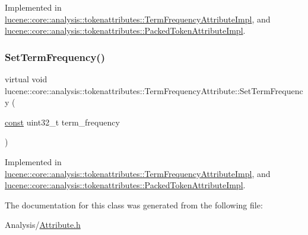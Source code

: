 Implemented in \mbox{\hyperlink{classlucene_1_1core_1_1analysis_1_1tokenattributes_1_1TermFrequencyAttributeImpl_adfd47f9d692a2fbe7a48d590f8c585cb}{lucene\+::core\+::analysis\+::tokenattributes\+::\+Term\+Frequency\+Attribute\+Impl}}, and \mbox{\hyperlink{classlucene_1_1core_1_1analysis_1_1tokenattributes_1_1PackedTokenAttributeImpl_a82aff8ded68bf64ab156382ca6862db2}{lucene\+::core\+::analysis\+::tokenattributes\+::\+Packed\+Token\+Attribute\+Impl}}.

\mbox{\label{classlucene_1_1core_1_1analysis_1_1tokenattributes_1_1TermFrequencyAttribute_aeb8ef8cc3f3ab6c8678b491ac3e1b682}} 
\subsubsection{\texorpdfstring{Set\+Term\+Frequency()}{SetTermFrequency()}}
{\footnotesize\ttfamily virtual void lucene\+::core\+::analysis\+::tokenattributes\+::\+Term\+Frequency\+Attribute\+::\+Set\+Term\+Frequency (\begin{DoxyParamCaption}\item[{\mbox{\hyperlink{ZlibCrc32_8h_a2c212835823e3c54a8ab6d95c652660e}{const}} uint32\+\_\+t}]{term\+\_\+frequency }\end{DoxyParamCaption})\hspace{0.3cm}{\ttfamily [pure virtual]}}



Implemented in \mbox{\hyperlink{classlucene_1_1core_1_1analysis_1_1tokenattributes_1_1TermFrequencyAttributeImpl_a7662b5bc48f8914a3df96ea22b742e5f}{lucene\+::core\+::analysis\+::tokenattributes\+::\+Term\+Frequency\+Attribute\+Impl}}, and \mbox{\hyperlink{classlucene_1_1core_1_1analysis_1_1tokenattributes_1_1PackedTokenAttributeImpl_a4d9dfc6cc7c825d42789245b8ca003c4}{lucene\+::core\+::analysis\+::tokenattributes\+::\+Packed\+Token\+Attribute\+Impl}}.



The documentation for this class was generated from the following file\+:\begin{DoxyCompactItemize}
\item 
Analysis/\mbox{\hyperlink{Analysis_2Attribute_8h}{Attribute.\+h}}\end{DoxyCompactItemize}
